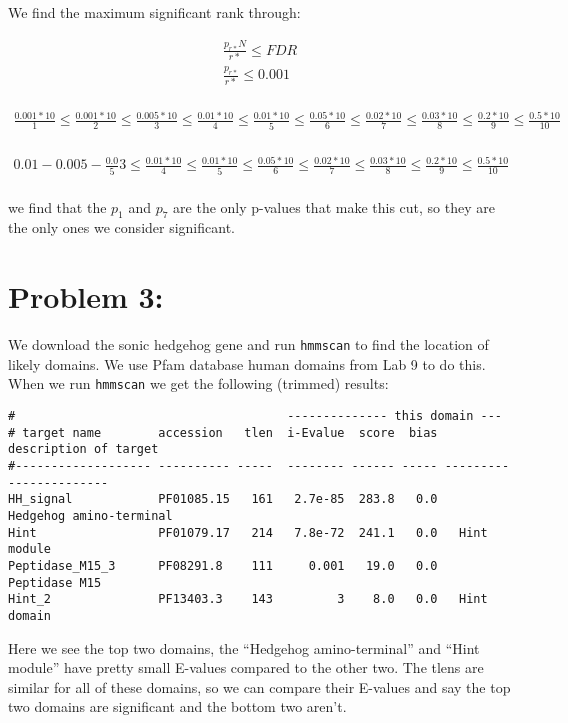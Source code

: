 \documentclass[10pt]{article} %
\begin{document}
We find the maximum significant rank through:

\begin{align*}
  \frac{p_{r*}N}{r*} \leq FDR\\
  \frac{p_{r*}}{r*} \leq 0.001\\
\end{align*}

\begin{align*}
  \frac{0.001 * 10}{1} \leq \frac{0.001 * 10}{2} \leq \frac{0.005 * 10}{3} \leq
  \frac{0.01 * 10}{4} \leq \frac{0.01 * 10}{5} \leq \frac{0.05 * 10}{6} \leq
  \frac{0.02 * 10}{7} \le \frac{0.03 * 10}{8} \leq \frac{0.2 * 10}{9} \leq
  \frac{0.5 * 10}{10}\\
\end{align*}

\begin{align*}
  0.01 - 0.005 - \frac{0.0}5{3} \leq
  \frac{0.01 * 10}{4} \leq \frac{0.01 * 10}{5} \leq \frac{0.05 * 10}{6} \leq
  \frac{0.02 * 10}{7} \le \frac{0.03 * 10}{8} \leq \frac{0.2 * 10}{9} \leq
  \frac{0.5 * 10}{10}\\
\end{align*}

we find that the $p_1$ and $p_7$ are the only p-values that make this cut, so they are the only
ones we consider significant.\\

\section{Problem 3: }
We download the sonic hedgehog gene and run \texttt{hmmscan} to find the location of likely domains.
We use Pfam database human domains from Lab 9 to do this. When we run \texttt{hmmscan} we get
the following (trimmed) results:

\begin{verbatim}
#                                      -------------- this domain ---
# target name        accession   tlen  i-Evalue  score  bias   description of target
#------------------- ---------- -----  -------- ------ ----- -----------------------
HH_signal            PF01085.15   161   2.7e-85  283.8   0.0   Hedgehog amino-terminal
Hint                 PF01079.17   214   7.8e-72  241.1   0.0   Hint module
Peptidase_M15_3      PF08291.8    111     0.001   19.0   0.0   Peptidase M15
Hint_2               PF13403.3    143         3    8.0   0.0   Hint domain
\end{verbatim}

Here we see the top two domains, the ``Hedgehog amino-terminal'' and ``Hint module'' have
pretty small E-values compared to the other two. The tlens are similar for all of these
domains, so we can compare their E-values and say the top two domains are significant and
the bottom two aren't.\\
\end{document}
